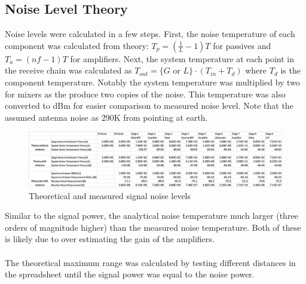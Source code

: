 \documentclass[letterpaper,12pt]{article}
\begin{document}
\subsection{Noise Level Theory}
Noise levels were calculated in a few steps. First, the noise temperature of each component was calculated from theory: $T_p = \left(\frac{1}{L}-1\right)T$ for passives and $T_a = (nf-1)T$ for amplifiers. Next, the system temperature at each point in the receive chain was calculated as $T_{out} = \{G \text{ or } L \} \cdot(T_{in} + T_d)$ where $T_d$ is the component temperature. Notably the system temperature was multiplied by two for mixers as the produce two copies of the noise. This temperature was also converted to dBm for easier comparison to measured noise level. Note that the assumed antenna noise as 290K from pointing at earth.
\begin{figure}[H]
	\begin{centering}
		\includegraphics[width=1\columnwidth]{figures/noise_theory}
		\caption{Theoretical and measured signal noise levels}
	\end{centering}
\end{figure}
\noindent
Similar to the signal power, the analytical noise temperature much larger (three orders of magnitude higher) than the measured noise temperature. Both of these is likely due to over estimating the gain of the amplifiers.
\\
\\
\noindent
The theoretical maximum range was calculated by testing different distances in the spreadsheet until the signal power was equal to the noise power.

\newpage
\end{document}
